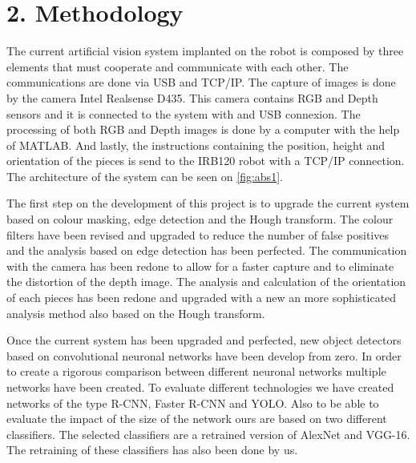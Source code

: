 {\section*{2. Methodology}
The current artificial vision system implanted on the robot is composed by three elements that must cooperate and communicate with each other. The communications are done via USB and TCP/IP. The capture of images is done by the camera Intel Realsense D435. This camera contains RGB and Depth sensors and it is connected to the system with and USB connexion. The processing of both RGB and Depth images is done by a computer with the help of MATLAB. And lastly, the instructions containing the position, height and orientation of the pieces is send to the IRB120 robot with a TCP/IP connection. The architecture of the system can be seen on \autoref{fig:abs1}.


The first step on the development of this project is to upgrade the current system based on colour masking, edge detection and the Hough transform. The colour filters have been revised and upgraded to reduce the number of false positives and the analysis based on edge detection has been perfected. The communication with the camera has been redone to allow for a faster capture and to eliminate the distortion of the depth image. The analysis and calculation of the orientation of each pieces has been redone and upgraded with a new an more sophisticated analysis method also based on the Hough transform. 

Once the current system has been upgraded and perfected, new object detectors based on convolutional neuronal networks have been develop from zero. In order to create a rigorous comparison between different neuronal networks multiple networks have been created. To evaluate different technologies we have created networks of the type R-CNN, Faster R-CNN and YOLO. Also to be able to evaluate the impact of the size of the network ours are based on two different classifiers. The selected classifiers are a retrained version of AlexNet and VGG-16. The retraining of these classifiers has also been done by us.

}
